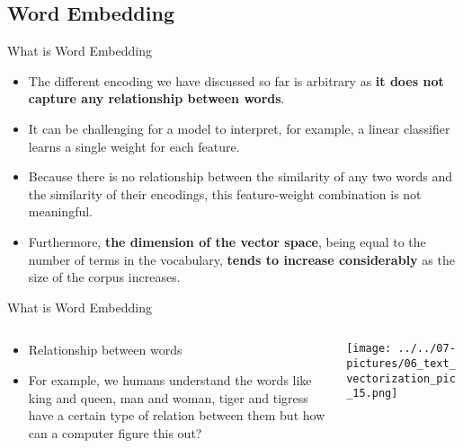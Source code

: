 \documentclass[11pt]{beamer}
\begin{document}
\subsection{Word Embedding \\ \scalebox{0.8}{}}
\begin{frame}{What is Word Embedding}
	\begin{itemize}
		\item The different encoding we have discussed so far is arbitrary as \textbf{it does not capture any relationship between words}. 
		\item It can be challenging for a model to interpret, for example, a linear classifier learns a single weight for each feature. 
		\item Because there is no relationship between the similarity of any two words and the similarity of their encodings, this feature-weight combination is not meaningful.
		\item Furthermore, \textbf{the dimension of the vector space}, being equal to the number of terms in the vocabulary, \textbf{tends to increase considerably} as the size of the corpus increases.
	\end{itemize}
\end{frame}
\begin{frame}{What is Word Embedding}
\begin{columns}[T] %
\begin{column}{.48\textwidth}
        \begin{itemize}
        \item Relationship between words
		\item For example, we humans understand the words like king and queen, man and woman, tiger and tigress have a certain type of relation between them but how can a computer figure this out?
        \end{itemize}
\end{column}%
\hfill%
\begin{column}{.48\textwidth}
        \texttt{[image: ../../07-pictures/06\_text\_vectorization\_pic\_15.png]}
\end{column}%
\end{columns}
\end{frame}
\end{document}
